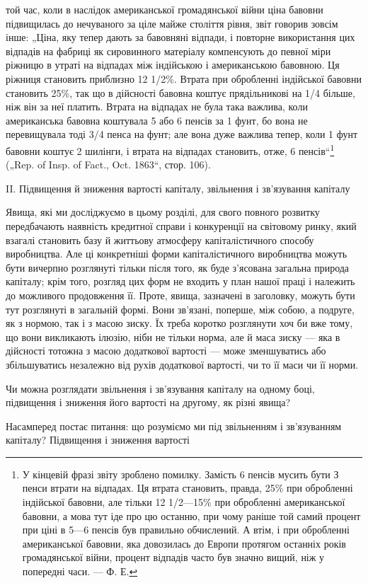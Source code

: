 \parcont{}  %
той час, коли в наслідок американської громадянської війни ціна
бавовни підвищилась до нечуваного за ціле майже століття
рівня, звіт говорив зовсім інше: „Ціна, яку тепер дають за бавовняні
відпади, і повторне використання цих відпадів на
фабриці як сировинного матеріалу компенсують до певної міри
ріжницю в утраті на відпадах між індійською і американською
бавовною. Ця ріжниця становить приблизно 12 1/2\%. Втрата при
обробленні індійської бавовни становить 25\%, так що в дійсності
бавовна коштує прядільникові на 1/4 більше, ніж він за неї
платить. Втрата на відпадах не була така важлива, коли американська
бавовна коштувала 5 або 6 пенсів за 1 фунт, бо вона
не перевищувала тоді 3/4 пенса на фунт; але вона дуже важлива
тепер, коли 1 фунт бавовни коштує 2 шилінги, і втрата на відпадах
становить, отже, 6 пенсів“\footnote{
У кінцевій фразі звіту зроблено помилку. Замість 6 пенсів мусить бути З
пенси втрати на відпадах. Ця втрата становить, правда, 25\% при обробленні
індійської бавовни, але тільки 12 1/2—15\% при обробленні американської бавовни,
а мова тут іде про цю останню, при чому раніше той самий процент при
ціні в 5—6 пенсів був правильно обчислений. А втім, і при обробленні американської
бавовни, яка довозилась до Европи протягом останніх років громадянської
війни, процент відпадів часто був значно вищий, ніж у попередні
часи. — Ф. Е.
} („Rep. of Insp. of Fact., Oct.
1863“, стор. 106).

II. Підвищення й зниження вартості капіталу, звільнення
і зв’язування капіталу

Явища, які ми досліджуємо в цьому розділі, для свого повного
розвитку передбачають наявність кредитної справи і конкуренції
на світовому ринку, який взагалі становить базу й життьову атмосферу
капіталістичного способу виробництва. Але ці конкретніші
форми капіталістичного виробництва можуть бути вичерпно розглянуті
тільки після того, як буде з’ясована загальна природа
капіталу; крім того, розгляд цих форм не входить у план нашої
праці і належить до можливого продовження її. Проте, явища,
зазначені в заголовку, можуть бути тут розглянуті в загальній
формі. Вони зв’язані, поперше, між собою, а подруге, як
з нормою, так і з масою зиску. Їх треба коротко розглянути
хоч би вже тому, що вони викликають ілюзію, ніби не тільки
норма, але й маса зиску — яка в дійсності тотожна з масою
додаткової вартості — може зменшуватись або збільшуватись
незалежно від рухів додаткової вартості, чи то її маси чи її
норми.

Чи можна розглядати звільнення і зв’язування капіталу на
одному боці, підвищення і зниження його вартості на другому,
як різні явища?

Насамперед постає питання: що розуміємо ми під звільненням
і зв’язуванням капіталу? Підвищення і зниження вартості
\parbreak{}  %
